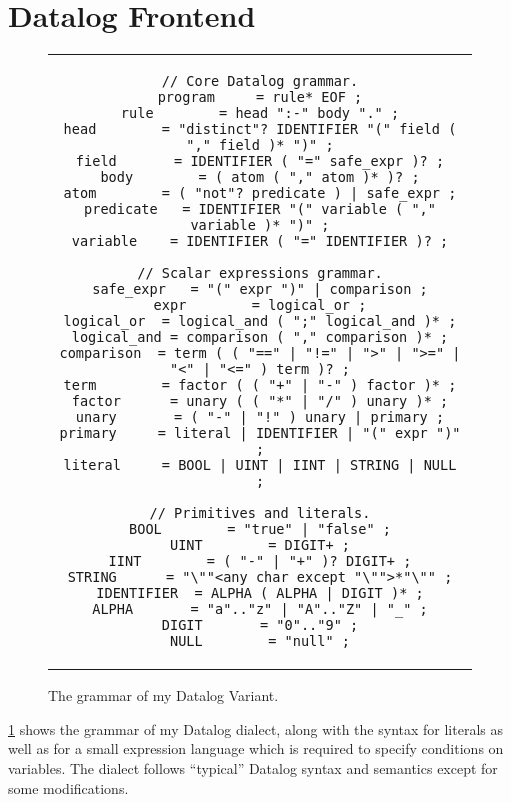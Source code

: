 \section{Datalog Frontend}\label{sec:datalog-frontend}

\begin{figure}[htpb]
	\centering
	\begin{tabular}{c}
		\begin{lstlisting}[keepspaces]
// Core Datalog grammar.
program     = rule* EOF ;
rule        = head ":-" body "." ;
head        = "distinct"? IDENTIFIER "(" field ( "," field )* ")" ;
field       = IDENTIFIER ( "=" safe_expr )? ;
body        = ( atom ( "," atom )* )? ;
atom        = ( "not"? predicate ) | safe_expr ;
predicate   = IDENTIFIER "(" variable ( "," variable )* ")" ;
variable    = IDENTIFIER ( "=" IDENTIFIER )? ;

// Scalar expressions grammar.
safe_expr   = "(" expr ")" | comparison ;
expr        = logical_or ;
logical_or  = logical_and ( ";" logical_and )* ;
logical_and = comparison ( "," comparison )* ;
comparison  = term ( ( "==" | "!=" | ">" | ">=" | "<" | "<=" ) term )? ;
term        = factor ( ( "+" | "-" ) factor )* ;
factor      = unary ( ( "*" | "/" ) unary )* ;
unary       = ( "-" | "!" ) unary | primary ;
primary     = literal | IDENTIFIER | "(" expr ")" ;
literal     = BOOL | UINT | IINT | STRING | NULL ;

// Primitives and literals.
BOOL        = "true" | "false" ;
UINT        = DIGIT+ ;
IINT        = ( "-" | "+" )? DIGIT+ ;
STRING      = "\""<any char except "\"">*"\"" ;
IDENTIFIER  = ALPHA ( ALPHA | DIGIT )* ;
ALPHA       = "a".."z" | "A".."Z" | "_" ;
DIGIT       = "0".."9" ;
NULL        = "null" ;\end{lstlisting}
	\end{tabular}
	\caption{The grammar of my Datalog Variant.}\label{code:datalog-grammar}
\end{figure}

\ref{code:datalog-grammar} shows the grammar of my Datalog dialect\footnotemark{},
along with the syntax for literals as well as for a small expression language
which is required to specify conditions on variables.
The dialect follows ``typical'' Datalog syntax and semantics
except for some modifications.


